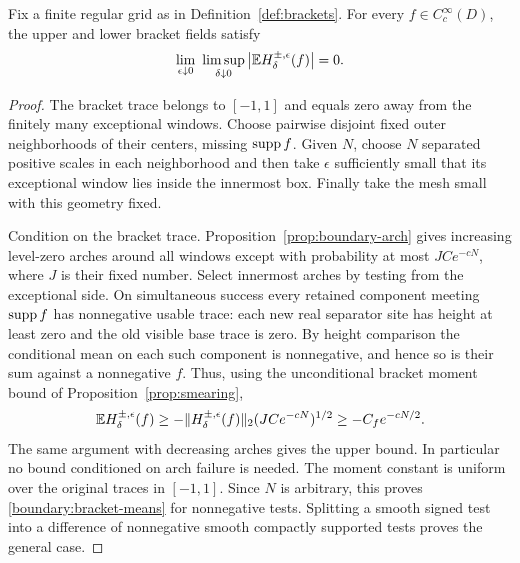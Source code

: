 \begin{proposition}
\label{prop:bracket-collapse}
Fix a finite regular grid as in Definition~\ref{def:brackets}.
For every $f\in C_c^\infty(D)$, the upper and lower bracket fields
satisfy
\begin{equation}
 \lim_{\epsilon\downarrow0}\ \limsup_{\delta\downarrow0}
 \left|\E H_\delta^{\pm,\epsilon}(f)\right|=0.
 \label{boundary:bracket-means}
\end{equation}
\end{proposition}

\begin{proof}
The bracket trace belongs to $[-1,1]$ and equals zero away from the
finitely many exceptional windows.  Choose pairwise disjoint fixed
outer neighborhoods of their centers, missing $\operatorname{supp} f$.  Given
$N$, choose $N$ separated positive scales in each neighborhood and
then take $\epsilon$ sufficiently small that its exceptional
window lies inside the innermost box.  Finally take the mesh small
with this geometry fixed.

Condition on the bracket trace.  Proposition~\ref{prop:boundary-arch}
gives increasing level-zero arches around all windows except with
probability at most $JC e^{-cN}$, where $J$ is their fixed number.
Select innermost arches by testing from the exceptional side.  On
simultaneous success every retained component meeting $\operatorname{supp} f$
has nonnegative usable trace: each new real separator site has
height at least zero and the old visible base trace is zero.  By
height comparison the conditional mean on each such component is
nonnegative, and hence so is their sum against a nonnegative $f$.
Thus, using the unconditional bracket moment bound
of Proposition~\ref{prop:smearing},
\[
 \mathbb E H_\delta^{\pm,\epsilon}(f)
 \ge -\|H_\delta^{\pm,\epsilon}(f)\|_2
       (JC e^{-cN})^{1/2}
 \ge -C_f e^{-cN/2}.
\]
The same argument with decreasing arches gives the upper bound.
In particular no bound conditioned on arch failure is needed.
The moment constant is uniform over the original traces in
$[-1,1]$.  Since $N$ is arbitrary, this proves
\eqref{boundary:bracket-means} for nonnegative tests.  Splitting a
smooth signed test into a difference of nonnegative smooth compactly
supported tests proves the general case.

\end{proof}

